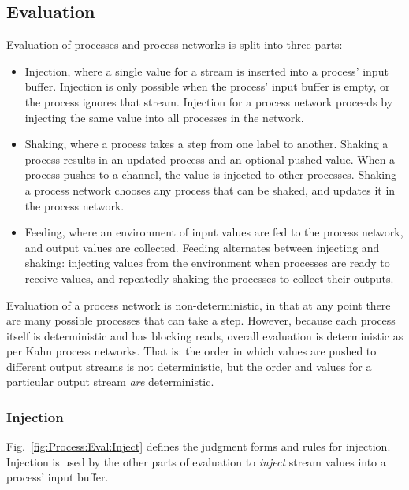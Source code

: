\subsection{Evaluation}
\label{s:Process:Eval}




Evaluation of processes and process networks is split into three parts:
\begin{itemize}
\item Injection, where a single value for a stream is inserted into a process' input buffer.
Injection is only possible when the process' input buffer is empty, or the process ignores that stream.
Injection for a process network proceeds by injecting the same value into all processes in the network.

\item Shaking, where a process takes a step from one label to another.
Shaking a process results in an updated process and an optional pushed value.
When a process pushes to a channel, the value is injected to other processes.
Shaking a process network chooses any process that can be shaked, and updates it in the process network.

\item Feeding, where an environment of input values are fed to the process network, and output values are collected.
Feeding alternates between injecting and shaking: injecting values from the environment when processes are ready to receive values, and repeatedly shaking the processes to collect their outputs.
\end{itemize}

Evaluation of a process network is non-deterministic, in that at any point there are many possible processes that can take a step.
However, because each process itself is deterministic and has blocking reads, overall evaluation is deterministic as per Kahn process networks.
That is: the order in which values are pushed to different output streams is not deterministic, but the order and values for a particular output stream \emph{are} deterministic.


\subsubsection{Injection}
Fig.~\ref{fig:Process:Eval:Inject} defines the judgment forms and rules for injection.
Injection is used by the other parts of evaluation to \emph{inject} stream values into a process' input buffer.

